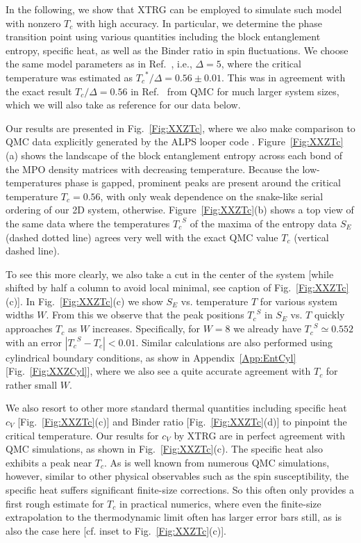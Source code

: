 \documentclass[aps,prx,twocolumn,showpacs,psfig,superscriptaddress,longbibliography]{revtex4-1}
\newcommand{\App}[1]{Appendix~\ref{#1}}
\newcommand{\Fig}[1]{Fig.~\ref{#1}}
\newcommand{\FIG}[1]{Figure~\ref{#1}}
\def\Tc{\ensuremath{T_c}\xspace}
\def\TcS{\ensuremath{\Tc^{S}}\xspace}
\begin{document}
In the following, we show that
XTRG can be employed to simulate such model with nonzero $\Tc$ with
high accuracy.  In particular, we determine the phase transition
point using various quantities including the block entanglement
entropy, specific heat, as well as the Binder ratio in spin
fluctuations.
%
We choose the same model parameters as in
Ref.~, i.e., $\Delta=5$, where the
critical temperature was estimated as $\Tc^\ast/\Delta = 0.56 \pm
0.01$. This was in agreement with the exact result $\Tc /\Delta =
0.56$ in Ref.~\cite{Goettel12} from QMC for much larger system
sizes, which we will also take as reference for our data below.

Our results are presented in \Fig{Fig:XXZTc}, where we also make
comparison to QMC data explicitly generated by the ALPS looper code
\cite{Bauer.b+:2011:ALPS}.
%
\FIG{Fig:XXZTc}(a) shows the landscape of the block entanglement
entropy across each bond of the MPO density matrices with decreasing
temperature. Because the low-temperatures phase is gapped, prominent
peaks are present around the critical temperature $\Tc=0.56$, with
only weak dependence on the snake-like serial ordering of our 2D
system, otherwise.  \FIG{Fig:XXZTc}(b) shows a top view of the same
data where the temperatures $\TcS$ of the maxima of the entropy data
$S_E$ (dashed dotted line) agrees very well with the exact QMC value
$\Tc$ (vertical dashed line). 

To see this more clearly, we also take a cut in the center of
the system [while shifted by half a column to avoid local minimal,
see caption of \Fig{Fig:XXZTc}(c)].  In \Fig{Fig:XXZTc}(c) we show
$S_E$ vs. temperature $T$ for various system widths $W$. From this
we observe that the peak positions $\TcS$ in $S_E$ vs. $T$ quickly
approaches $\Tc$ as $W$ increases.  Specifically, for $W=8$ we
already have $\TcS \simeq 0.552$ with an error  $|\TcS-\Tc | <
0.01$.
%
Similar calculations are also performed using cylindrical boundary
conditions, as show in \App{App:EntCyl} [\Fig{Fig:XXZCyl}], where we
also see a quite accurate agreement with $\Tc$ for rather small
$W$.

We also resort to other more standard thermal quantities
including specific heat $c_V$ [\Fig{Fig:XXZTc}(c)] and Binder ratio
[\Fig{Fig:XXZTc}(d)] to pinpoint the critical temperature.  Our
results for $c_V$ by XTRG are in perfect agreement with QMC
simulations, as shown in \Fig{Fig:XXZTc}(c).
%
The specific heat also exhibits a peak near $\Tc$. As is well known
from numerous QMC simulations, however, similar to other physical
observables such as the spin susceptibility, the specific heat
suffers significant finite-size corrections. So this often only
provides a first rough estimate for $\Tc$ in practical numerics,
where even the finite-size extrapolation to the thermodynamic limit
often has larger error bars still, as is also the case here [cf.
inset to \Fig{Fig:XXZTc}(c)].
\end{document}
